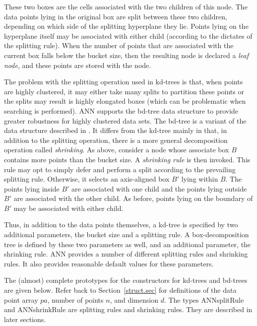 \documentclass[11pt]{article}		%
\newcommand{\ANN}[0]{\textsf{ANN}}
\begin{document}
These two boxes are the cells associated with the two children of this
node.  The data points lying in the original box are split between these
two children, depending on which side of the splitting hyperplane they
lie.  Points lying on the hyperplane itself may be associated with either
child (according to the dictates of the splitting rule).  When the number
of points that are associated with the current box falls below the bucket
size, then the resulting node is declared a \emph{leaf node}, and these
points are stored with the node.

The problem with the splitting operation used in kd-trees is that, when
points are highly clustered, it may either take many splits to partition
these points or the splits may result is highly elongated boxes (which can
be problematic when searching is performed).  {\ANN} supports the bd-tree
data structure to provide greater robustness for highly clustered data
sets.  The bd-tree is a variant of the data structure described in
\cite{AMN98}.  It differs from the kd-tree mainly in that, in addition
to the splitting operation, there is a more general decomposition operation
called \emph{shrinking}.  As above, consider a node whose associate box
$B$ contains more points than the bucket size.  A \emph{shrinking rule}
is then invoked.  This rule may opt to simply defer and perform a split
according to the prevailing splitting rule.  Otherwise, it selects an
axis-aligned box $B'$ lying within $B$.  The points lying inside $B'$
are associated with one child and the points lying outside $B'$ are
associated with the other child.  As before, points lying on the boundary
of $B'$ may be associated with either child.

Thus, in addition to the data points themselves, a kd-tree is specified by
two additional parameters, the bucket size and a splitting rule.  A
box-decomposition tree is defined by these two parameters as well, and an
additional parameter, the shrinking rule.  {\ANN} provides a number of
different splitting rules and shrinking rules.  It also provides
reasonable default values for these parameters.

The (almost) complete prototypes for the constructors for kd-trees and
bd-trees are given below.  Refer back to Section~\ref{struct.sec} for
definitions of the data point array $pa$, number of points $n$, and
dimension $d$.  The types \textsf{ANNsplitRule} and \textsf{ANNshrinkRule}
are splitting rules and shrinking rules.  They are described in later
sections.
\end{document}
